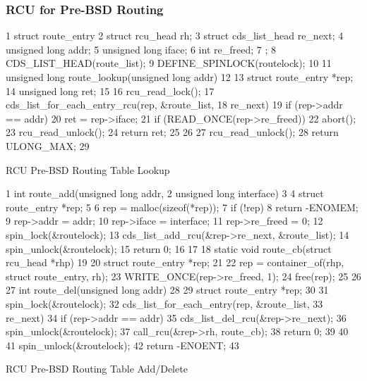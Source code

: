\subsubsection{RCU for Pre-BSD Routing}
\label{sec:defer:RCU for Pre-BSD Routing}

\begin{listing}[tbp]
{ \scriptsize
\begin{verbbox}
 1 struct route_entry {
 2   struct rcu_head rh;
 3   struct cds_list_head re_next;
 4   unsigned long addr;
 5   unsigned long iface;
 6   int re_freed;
 7 };
 8 CDS_LIST_HEAD(route_list);
 9 DEFINE_SPINLOCK(routelock);
10
11 unsigned long route_lookup(unsigned long addr)
12 {
13   struct route_entry *rep;
14   unsigned long ret;
15
16   rcu_read_lock();
17   cds_list_for_each_entry_rcu(rep, &route_list,
18                               re_next) {
19     if (rep->addr == addr) {
20       ret = rep->iface;
21       if (READ_ONCE(rep->re_freed))
22         abort();
23       rcu_read_unlock();
24       return ret;
25     }
26   }
27   rcu_read_unlock();
28   return ULONG_MAX;
29 }
\end{verbbox}
}
\centering
\theverbbox
\caption{RCU Pre-BSD Routing Table Lookup}
\label{lst:defer:RCU Pre-BSD Routing Table Lookup}
\end{listing}

\begin{listing}[tbp]
{ \scriptsize
\begin{verbbox}
 1 int route_add(unsigned long addr,
 2               unsigned long interface)
 3 {
 4   struct route_entry *rep;
 5
 6   rep = malloc(sizeof(*rep));
 7   if (!rep)
 8     return -ENOMEM;
 9   rep->addr = addr;
10   rep->iface = interface;
11   rep->re_freed = 0;
12   spin_lock(&routelock);
13   cds_list_add_rcu(&rep->re_next, &route_list);
14   spin_unlock(&routelock);
15   return 0;
16 }
17
18 static void route_cb(struct rcu_head *rhp)
19 {
20   struct route_entry *rep;
21
22   rep = container_of(rhp, struct route_entry, rh);
23   WRITE_ONCE(rep->re_freed, 1);
24   free(rep);
25 }
26
27 int route_del(unsigned long addr)
28 {
29   struct route_entry *rep;
30
31   spin_lock(&routelock);
32   cds_list_for_each_entry(rep, &route_list,
33                           re_next) {
34     if (rep->addr == addr) {
35       cds_list_del_rcu(&rep->re_next);
36       spin_unlock(&routelock);
37       call_rcu(&rep->rh, route_cb);
38       return 0;
39     }
40   }
41   spin_unlock(&routelock);
42   return -ENOENT;
43 }
\end{verbbox}
}
\centering
\theverbbox
\caption{RCU Pre-BSD Routing Table Add/Delete}
\label{lst:defer:RCU Pre-BSD Routing Table Add/Delete}
\end{listing}

